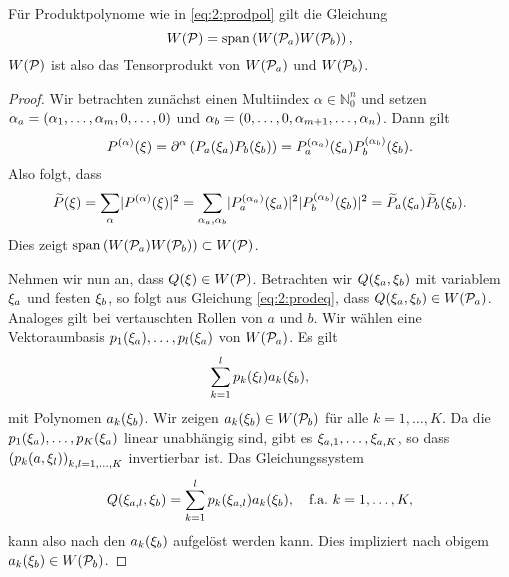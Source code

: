 \begin{thm}
Für Produktpolynome wie in \eqref{eq:2:prodpol}
gilt die Gleichung
\begin{equation}
W(\mathcal P)=\operatorname{span}\left(W(\mathcal P_a) W(\mathcal P_b)\right),
\end{equation}
$W(\mathcal P)$ ist also das Tensorprodukt von $W(\mathcal P_a)$ und $W(\mathcal P_b)$.
\end{thm}
\begin{proof}
Wir betrachten zunächst einen Multiindex $\alpha\in\mathbb N_0^n$ und setzen $\alpha_a=(\alpha_1,\dots,\alpha_m,0,\dots,0)$
und $\alpha_b=(0,\dots,0,\alpha_{m+1},\dots,\alpha_n)$. Dann gilt
\begin{equation}
P^{(\alpha)}(\xi)
=\partial^\alpha\left(P_a(\xi_a)P_b(\xi_b)\right)
=P^{(\alpha_a)}_a(\xi_a)P^{(\alpha_b)}_b(\xi_b).
\end{equation} 
Also folgt, dass
\begin{equation}\label{eq:2:prodeq}
\widetilde{P}(\xi)=\sum_\alpha\lvert P^{(\alpha)}(\xi)\rvert^2
=\sum_{\alpha_a,\alpha_b}\lvert P^{(\alpha_a)}_a(\xi_a)\rvert^2\lvert P^{(\alpha_b)}_b(\xi_b)\rvert^2
=\widetilde{P}_a(\xi_a)\widetilde{P}_b(\xi_b).
\end{equation}
Dies zeigt $\operatorname{span}\left(W(\mathcal P_a) W(\mathcal P_b)\right)\subset W(\mathcal P)$. 

Nehmen wir nun an, dass $Q(\xi)\in W(\mathcal P)$.
Betrachten wir $Q(\xi_a,\xi_{b})$ mit variablem $\xi_a$ und festen $\xi_{b}$,
so folgt aus Gleichung \eqref{eq:2:prodeq},
dass $Q(\xi_a,\xi_{b})\in W(\mathcal P_a)$.
Analoges gilt bei vertauschten Rollen von $a$ und $b$.
Wir wählen eine Vektoraumbasis $p_1(\xi_a),\dots,p_l(\xi_a)$ von $W(\mathcal P_a)$.
Es gilt
\begin{equation}
\sum_{k=1}^lp_k(\xi_l)a_k(\xi_b),
\end{equation}
mit Polynomen $a_k(\xi_b)$.
Wir zeigen $a_k(\xi_b)\in W(\mathcal P_b)$ für alle $k=1,\dots,K$.
Da die $p_1(\xi_a),\dots,p_K(\xi_a)$ linear unabhängig sind,
gibt es $\xi_{a,1},\dots,\xi_{a,K}$,
so dass $\left(p_k(a,\xi_l)\right)_{k,l=1,\dots,K}$ invertierbar ist.
Das Gleichungssystem
\begin{equation}
Q(\xi_{a,l},\xi_b)=\sum_{k=1}^lp_k(\xi_{a,l})a_k(\xi_b),\quad\text{f.a.}~k=1,\dots,K,
\end{equation}
kann also nach den $a_k(\xi_b)$ aufgelöst werden kann.
Dies impliziert nach obigem $a_k(\xi_b)\in W(\mathcal P_b)$.

\end{proof}

